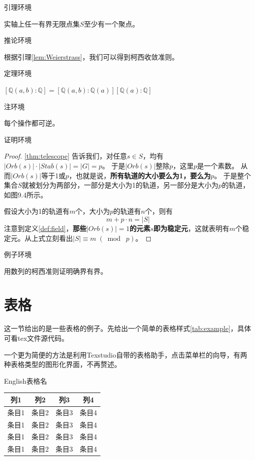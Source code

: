 引理环境
\begin{lemma}\rm{\cite{Azizov2003On}}\label{lem:Weierstrass}
	实轴上任一有界无限点集$S$至少有一个聚点。
\end{lemma}

推论环境
\begin{corollary}
	根据引理\ref{lem:Weierstrass}，我们可以得到柯西收敛准则。
\end{corollary}

定理环境
\begin{theorem}[望远镜公式]\label{thm:telescope}
	$\left[\mathbb{Q}(a, b) : \mathbb{Q}\right]=\left[\mathbb{Q}(a, b) : \mathbb{Q}(a)\right]\left[\mathbb{Q}(a) : \mathbb{Q}\right] $
\end{theorem}

注环境
\begin{remark}\label{rem:reversible}
	每个操作都可逆。
\end{remark}

证明环境
\begin{proof}
	\autoref{thm:telescope} 告诉我们，对任意$s\in S$，均有$\lvert Orb(s)\rvert \cdot \lvert Stab(s)\rvert=\lvert G\rvert=p$。 于是$\lvert Orb(s)\rvert $整除$p$，这里$p$是一个素数。
	从而$\lvert Orb(s)\rvert $等于1或$p$，也就是说，\textbf{所有轨道的大小要么为1，要么为$p$}。
	于是整个集合$S$就被划分为两部分，一部分是大小为1的轨道，另一部分是大小为$p$的轨道，如图9.4所示。
	
	假设大小为1的轨道有$m$个，大小为$p$的轨道有$n$个，则有
	\begin{equation}
		m+p\cdot n=\lvert S\rvert 
	\end{equation}
	注意到定义\ref{def:field}，\textbf{那些$\lvert Orb(s)\rvert =1$的元素$s$即为稳定元}，这就表明有$m$个稳定元。从上式立刻看出$\lvert S \rvert \equiv  m\; (\bmod\; p)$。
\end{proof}
 

例子环境
\begin{example}
	用数列的柯西准则证明确界有界。
\end{example}

\section{表格}

这一节给出的是一些表格的例子。先给出一个简单的表格样式\autoref{tab:example}，具体可看tex文件源代码。

一个更为简便的方法是利用Texstudio自带的表格助手，点击菜单栏的向导，有两种表格类型的图形化界面，不再赘述。
\begin{table}[!htp]
	\centering
	{English表格名}\label{tab:example}
	\begin{tabular}{c|c|c|c}
	\hline
		列1	&	列2	&	列3	&	列4\\
	\hline
		条目1	& 条目2	&	条目3	&	条目4 \\
		条目1	& 条目2	&	条目3	&	条目4 \\
		条目1	& 条目2	&	条目3	&	条目4 \\
		条目1	& 条目2	&	条目3	&	条目4 \\
	\hline
	\end{tabular}
	\label{table1}
\end{table}

